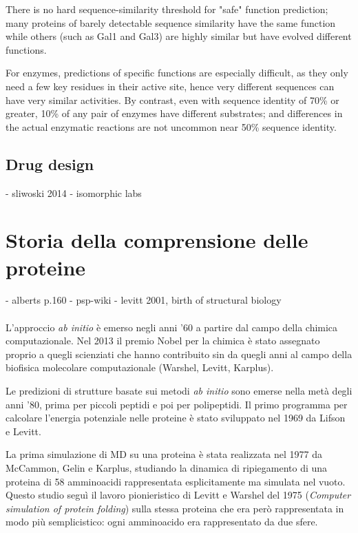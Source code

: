 There is no hard sequence-similarity threshold for "safe" function prediction; many proteins of barely
detectable sequence similarity have the same function while others (such as Gal1 and Gal3) are highly
similar but have evolved different functions. 

For enzymes, predictions of specific functions are especially difficult, as they only need a few key residues
in their active site, hence very different sequences can have very similar activities. By contrast, even with
sequence identity of 70\% or greater, 10\% of any pair of enzymes have different substrates; and differences
in the actual enzymatic reactions are not uncommon near 50\% sequence identity.

\subsection{Drug design}
- sliwoski 2014
- isomorphic labs

\section{Storia della comprensione delle proteine}
- alberts p.160
- psp-wiki
- levitt 2001, birth of structural biology \\ \\


L'approccio \textit{ab initio} è emerso negli anni '60 a partire dal campo della chimica computazionale. Nel 2013 il premio Nobel per la chimica è stato assegnato proprio a quegli scienziati che hanno contribuito sin da quegli anni al campo della biofisica molecolare computazionale (Warshel, Levitt, Karplus).

\par Le predizioni di strutture basate sui metodi \textit{ab initio} sono emerse nella metà degli anni '80, prima per piccoli peptidi e poi per polipeptidi. Il primo programma per calcolare l'energia potenziale nelle proteine è stato sviluppato nel 1969 da Lifson e Levitt\supercite{levitt1969refinement}.

\par La prima simulazione di MD su una proteina è stata realizzata nel 1977 da McCammon, Gelin e Karplus\supercite{mccammon1977dynamics}, studiando la dinamica di ripiegamento di una proteina di 58 amminoacidi rappresentata esplicitamente ma simulata nel vuoto. Questo studio seguì il lavoro pionieristico di Levitt e Warshel del 1975 (\textit{Computer simulation of protein folding}\supercite{levitt1975computer}) sulla stessa proteina che era però rappresentata in modo più semplicistico: ogni amminoacido era rappresentato da due sfere. 

